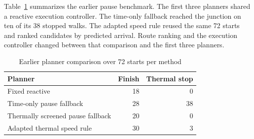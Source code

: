 \documentclass{ieeeaccess}
\begin{document}
Table~\ref{tab:earlier-planners} summarizes the earlier pause benchmark. The first three planners shared a reactive execution controller. The time-only fallback reached the junction on ten of its 38 stopped walks. The adapted speed rule reused the same 72 starts and ranked candidates by predicted arrival. Route ranking and the execution controller changed between that comparison and the first three planners.

\begin{table}[!t]
\caption{Earlier planner comparison over 72 starts per method}
\label{tab:earlier-planners}
\centering
\footnotesize
\renewcommand{\arraystretch}{1.13}
\begin{tabular}{@{}lrr@{}}
\hline
Planner & Finish & Thermal stop \\
\hline
Fixed reactive & 18 & 0 \\
Time-only pause fallback & 28 & 38 \\
Thermally screened pause fallback & 20 & 0 \\
Adapted thermal speed rule & 30 & 3 \\
\hline
\end{tabular}
\end{table}
\end{document}
